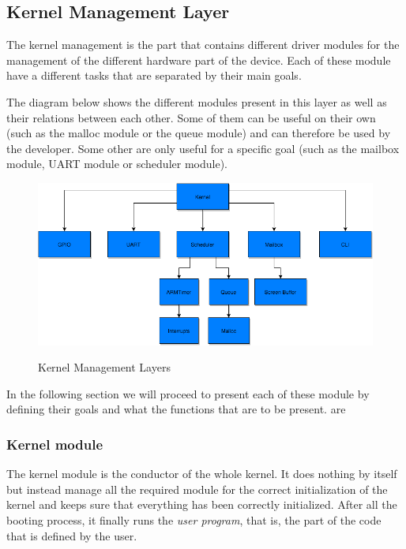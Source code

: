 \subsection{Kernel Management Layer}
The kernel management is the part that contains different driver modules for the management of the different hardware part of the device. Each of these module have a different tasks that are separated by their main goals.

The diagram below shows the different modules present in this layer as well as their relations between each other. Some of them can be useful on their own (such as the malloc module or the queue module) and can therefore be used by the developer. Some other are only useful for a specific goal (such as the mailbox module, UART module or scheduler module).

\begin{figure}[H]
\begin{center}
\includegraphics[width=1\textwidth]{includes/figures/chapter5_kernel_management_layer.png}  \\[0.5 cm]
\caption{Kernel Management Layers}
\end{center}
\label{fig:chapter5_kernel_management_layer}
\end{figure}


In the following section we will proceed to present each of these module by defining their goals and what the functions that are to be present.
 are
\subsubsection{Kernel module}
The kernel module is the conductor of the whole kernel. It does nothing by itself but instead manage all the required module for the correct initialization of the kernel and keeps sure that everything has been correctly initialized. After all the booting process, it finally runs the \textit{user program}, that is, the part of the code that is defined by the user. 

